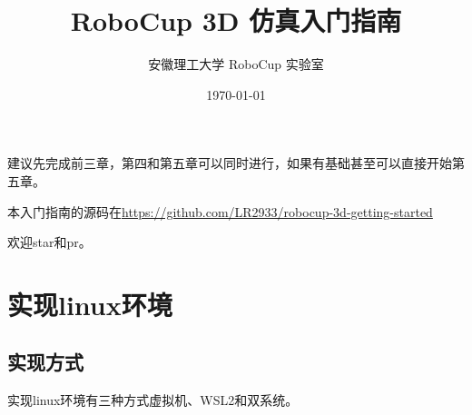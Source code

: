 \documentclass[11pt, UTF8, a4paper]{ctexart} %
\title{\textbf{RoboCup 3D 仿真入门指南}}
\author{安徽理工大学 RoboCup 实验室}
\date{\today}
\begin{document}
\maketitle
建议先完成前三章，第四和第五章可以同时进行，如果有基础甚至可以直接开始第五章。

本入门指南的源码在\url{https://github.com/LR2933/robocup-3d-getting-started}

欢迎star和pr。
\tableofcontents %
\vspace{5cm} 
\newpage

\section{实现linux环境}
\subsection{实现方式}
实现linux环境有三种方式虚拟机、WSL2和双系统。
\end{document}
